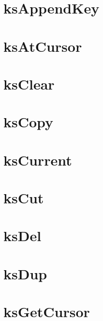 \let\mypdfximage\pdfximage\def\pdfximage{\immediate\mypdfximage}\documentclass[twoside]{book}
\newcommand{\+}{\discretionary{\mbox{\scriptsize$\hookleftarrow$}}{}{}}
\begin{document}
\chapter{ks\+Append\+Key}
\label{doc_api_review_core_ksAppendKey_md}

\chapter{ks\+At\+Cursor}
\label{doc_api_review_core_ksAtCursor_md}

\chapter{ks\+Clear}
\label{doc_api_review_core_ksClear_md}

\chapter{ks\+Copy}
\label{doc_api_review_core_ksCopy_md}

\chapter{ks\+Current}
\label{doc_api_review_core_ksCurrent_md}

\chapter{ks\+Cut}
\label{doc_api_review_core_ksCut_md}

\chapter{ks\+Del}
\label{doc_api_review_core_ksDel_md}

\chapter{ks\+Dup}
\label{doc_api_review_core_ksDup_md}

\chapter{ks\+Get\+Cursor}
\label{doc_api_review_core_ksGetCursor_md}

\end{document}
